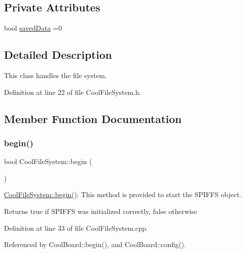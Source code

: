 \subsection*{Private Attributes}
\begin{DoxyCompactItemize}
\item 
bool \hyperlink{classCoolFileSystem_ad398e0c5c41a0c88acdf5d672aa71351}{saved\+Data} =0
\end{DoxyCompactItemize}


\subsection{Detailed Description}
This class handles the file system. 

Definition at line 22 of file Cool\+File\+System.\+h.



\subsection{Member Function Documentation}
\mbox{\label{classCoolFileSystem_a6ba6f666ed4c530174f8569d2c636748}} 
\subsubsection{\texorpdfstring{begin()}{begin()}}
{\footnotesize\ttfamily bool Cool\+File\+System\+::begin (\begin{DoxyParamCaption}{ }\end{DoxyParamCaption})}

\hyperlink{classCoolFileSystem_a6ba6f666ed4c530174f8569d2c636748}{Cool\+File\+System\+::begin()}\+: This method is provided to start the S\+P\+I\+F\+FS object.

\begin{DoxyReturn}{Returns}
true if S\+P\+I\+F\+FS was initialized correctly, false otherwise 
\end{DoxyReturn}


Definition at line 33 of file Cool\+File\+System.\+cpp.



Referenced by Cool\+Board\+::begin(), and Cool\+Board\+::config().


